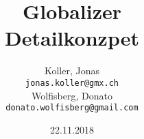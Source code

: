 \title{
	\Huge
	\textbf{Globalizer} \\
	\vspace{0.2cm}
	\LARGE
	Detailkonzpet
}

\date{22.11.2018}

\author{
	Koller, Jonas\\
	\texttt{jonas.koller@gmx.ch} \\
	Wolfisberg, Donato \\
	\texttt{donato.wolfisberg@gmail.com}
}

\pagestyle{fancy}
\fancyhf{}
\cfoot{\thedate}
\rfoot{\thepage}

\renewcommand{\headrulewidth}{1pt}
\renewcommand{\footrulewidth}{1pt}

\renewcommand{\contentsname}{Inhalt}

\begin{titlepage}

  \begin{center}
    \vspace*{-2cm}

    \thetitle

    \vspace{2cm}

    \textbf{\theauthor}

    \vspace{1.5cm}

    \thedate
  \end{center}

  \vfill

  \begin{figure}[H]
    \vspace*{-5cm}
  \end{figure}
\end{titlepage}

\newpage
{}
